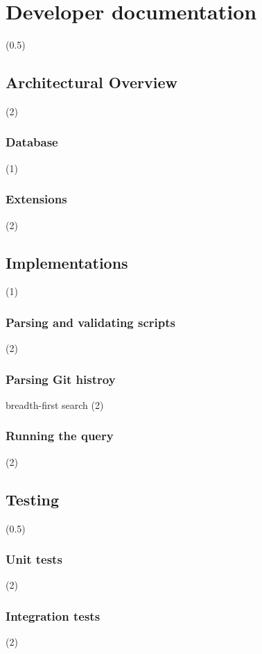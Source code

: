 \chapter{Developer documentation}
\label{ch:impl}

(0.5)

\section{Architectural Overview}

(2)

\subsection{Database}

(1)

\subsection{Extensions}

(2)

\section{Implementations}

(1)

\subsection{Parsing and validating scripts}

(2)

\subsection{Parsing Git histroy}

breadth-first search (2)

\subsection{Running the query}

(2)

\section{Testing}

(0.5)

\subsection{Unit tests}

(2)

\subsection{Integration tests}

(2)